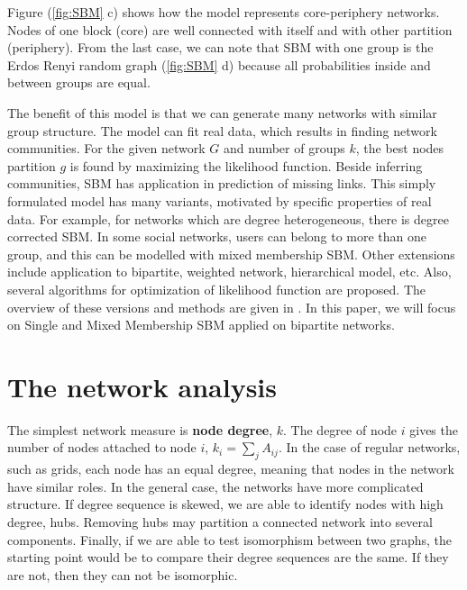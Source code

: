 Figure (\ref{fig:SBM} c) shows how the model represents core-periphery networks. Nodes of one block (core) are well connected with itself and with other partition (periphery). From the last case, we can note that SBM with one group is the Erdos Renyi random graph (\ref{fig:SBM} d) because all probabilities inside and between groups are equal.

The benefit of this model is that we can generate many networks with similar group structure. The model can fit real data, which results in finding network communities. For the given network $G$ and number of groups $k$, the best nodes partition $g$ is found by maximizing the likelihood function. Beside inferring communities, SBM has application in prediction of missing links. This simply formulated model has many variants, motivated by specific properties of real data. For example, for networks which are degree heterogeneous, there is degree corrected SBM. In some social networks, users can belong to more than one group, and this can be modelled with mixed membership SBM. Other extensions include application to bipartite, weighted network, hierarchical model, etc. Also, several algorithms for optimization of likelihood function are proposed. The overview of these versions and methods are given in \cite{comparison}. In this paper, we will focus on Single and Mixed Membership SBM applied on bipartite networks.  

\section{The network analysis}


The simplest network measure is \textbf{node degree}, $k$. The degree of node $i$ gives the number of nodes attached to node $i$, $k_i = \sum_j A_{ij}$. In the case of regular networks, such as grids, each node has an equal degree, meaning that nodes in the network have similar roles. In the general case, the networks have more complicated structure. If degree sequence is skewed, we are able to identify nodes with high degree, hubs. Removing hubs may partition a connected network into several components. Finally, if we are able to test isomorphism between two graphs, the starting point would be to compare their degree sequences are the same. If they are not, then they can not be isomorphic. \\

